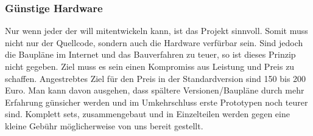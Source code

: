 \documentclass[11pt]{amsart}
\begin{document}
\subsubsection{G\"unstige Hardware}
Nur wenn jeder der will mitentwickeln kann, ist das Projekt sinnvoll. Somit muss nicht nur der Quellcode, sondern auch die Hardware verf\"urbar sein. Sind jedoch die Baupl\"ane im Internet und das Bauverfahren zu teuer, so ist dieses Prinzip nicht gegeben. Ziel muss es sein einen Kompromiss aus Leistung und Preis zu schaffen. Angestrebtes Ziel f\"ur den Preis in der Standardversion sind 150 bis 200 Euro. Man kann davon ausgehen, dass sp\"altere Versionen/Baupl\"ane durch mehr Erfahrung g\"unsicher werden und im Umkehrschluss erste Prototypen noch teurer sind. Komplett sets, zusammengebaut und in Einzelteilen werden gegen eine kleine Geb\"uhr m\"oglicherweise von uns bereit gestellt.  
\end{document}
